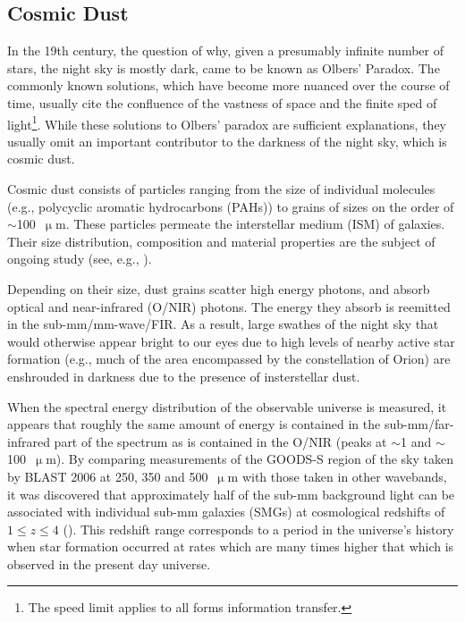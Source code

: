 \subsection{Cosmic Dust}

In the 19th century, the question of why, given a presumably infinite number of stars, the night sky is mostly dark, came to be known as Olbers' Paradox. The commonly known solutions, which have become more nuanced over the course of time, usually cite the confluence of the vastness of space and the finite sped of light\footnote{The speed limit applies to all forms information transfer.}. While these solutions to Olbers' paradox are sufficient explanations, they usually omit an important contributor to the darkness of the night sky, which is cosmic dust.

Cosmic dust consists of particles ranging from the size of individual molecules (e.g., polycyclic aromatic hydrocarbons (PAHs)) to grains of sizes on the order of $\sim$100~$\upmu$m. These particles permeate the interstellar medium (ISM) of galaxies. Their size distribution, composition and material properties are the subject of ongoing study (see, e.g., \citet{andersson2015interstellar,draine2003interstellar}).

Depending on their size, dust grains scatter high energy photons, and absorb optical and near-infrared (O/NIR) photons. The energy they absorb is reemitted in the sub-mm/mm-wave/FIR. As a result, large swathes of the night sky that would otherwise appear bright to our eyes due to high levels of nearby active star formation (e.g., much of the area encompassed by the constellation of Orion) are enshrouded in darkness due to the presence of insterstellar dust.

When the spectral energy distribution of the observable universe is measured, it appears that roughly the same amount of energy is contained in the sub-mm/far-infrared part of the spectrum as is contained in the O/NIR (peaks at $\sim$1 and $\sim$100~$\upmu$m). By comparing measurements of the GOODS-S region of the sky taken by BLAST 2006 at 250, 350 and 500~$\upmu$m with those taken in other wavebands, it was discovered that approximately half of the sub-mm background light can be associated with individual sub-mm galaxies (SMGs) at cosmological redshifts of $1 \leq z \leq 4$ (\citet{devlin2009over,marsden2009blast,pascale2009blast}). This redshift range corresponds to a period in the universe's history when star formation occurred at rates which are many times higher that which is observed in the present day universe.


